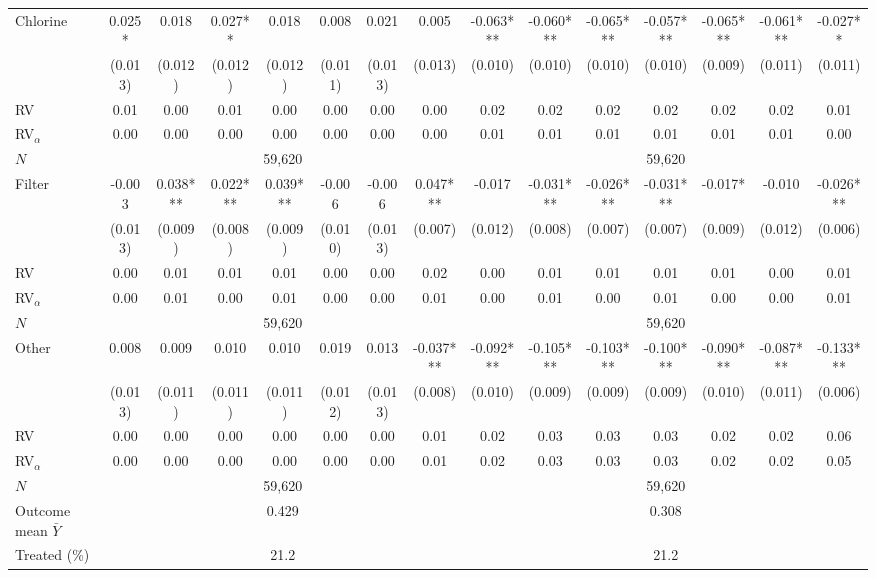 \begin{landscape}
\begin{table}[htbp]
\begin{adjustbox}{max width=\linewidth, max totalheight=0.70\textwidth, center}
\begin{tabular}{l|ccccccc|ccccccc}
\midrule
Chlorine & 0.025* & 0.018 & 0.027** & 0.018 & 0.008 & 0.021 & 0.005 & -0.063*** & -0.060*** & -0.065*** & -0.057*** & -0.065*** & -0.061*** & -0.027** \\
 & (0.013) & (0.012) & (0.012) & (0.012) & (0.011) & (0.013) & (0.013) & (0.010) & (0.010) & (0.010) & (0.010) & (0.009) & (0.011) & (0.011) \\
\quad RV & 0.01 & 0.00 & 0.01 & 0.00 & 0.00 & 0.00 & 0.00 & 0.02 & 0.02 & 0.02 & 0.02 & 0.02 & 0.02 & 0.01 \\
\quad RV$_\alpha$ & 0.00 & 0.00 & 0.00 & 0.00 & 0.00 & 0.00 & 0.00 & 0.01 & 0.01 & 0.01 & 0.01 & 0.01 & 0.01 & 0.00 \\
\quad $N$ & \multicolumn{7}{c|}{59,620} & \multicolumn{7}{c}{59,620} \\
\midrule
Filter & -0.003 & 0.038*** & 0.022*** & 0.039*** & -0.006 & -0.006 & 0.047*** & -0.017 & -0.031*** & -0.026*** & -0.031*** & -0.017* & -0.010 & -0.026*** \\
 & (0.013) & (0.009) & (0.008) & (0.009) & (0.010) & (0.013) & (0.007) & (0.012) & (0.008) & (0.007) & (0.007) & (0.009) & (0.012) & (0.006) \\
\quad RV & 0.00 & 0.01 & 0.01 & 0.01 & 0.00 & 0.00 & 0.02 & 0.00 & 0.01 & 0.01 & 0.01 & 0.01 & 0.00 & 0.01 \\
\quad RV$_\alpha$ & 0.00 & 0.01 & 0.00 & 0.01 & 0.00 & 0.00 & 0.01 & 0.00 & 0.01 & 0.00 & 0.01 & 0.00 & 0.00 & 0.01 \\
\quad $N$ & \multicolumn{7}{c|}{59,620} & \multicolumn{7}{c}{59,620} \\
\midrule
Other & 0.008 & 0.009 & 0.010 & 0.010 & 0.019 & 0.013 & -0.037*** & -0.092*** & -0.105*** & -0.103*** & -0.100*** & -0.090*** & -0.087*** & -0.133*** \\
 & (0.013) & (0.011) & (0.011) & (0.011) & (0.012) & (0.013) & (0.008) & (0.010) & (0.009) & (0.009) & (0.009) & (0.010) & (0.011) & (0.006) \\
\quad RV & 0.00 & 0.00 & 0.00 & 0.00 & 0.00 & 0.00 & 0.01 & 0.02 & 0.03 & 0.03 & 0.03 & 0.02 & 0.02 & 0.06 \\
\quad RV$_\alpha$ & 0.00 & 0.00 & 0.00 & 0.00 & 0.00 & 0.00 & 0.01 & 0.02 & 0.03 & 0.03 & 0.03 & 0.02 & 0.02 & 0.05 \\
\quad $N$ & \multicolumn{7}{c|}{59,620} & \multicolumn{7}{c}{59,620} \\
\midrule
Outcome mean $\bar Y$ & \multicolumn{7}{c|}{0.429} & \multicolumn{7}{c}{0.308} \\
Treated (\%) & \multicolumn{7}{c|}{21.2} & \multicolumn{7}{c}{21.2} \\

\end{tabular}
\end{adjustbox}
\end{table}
\end{landscape}
